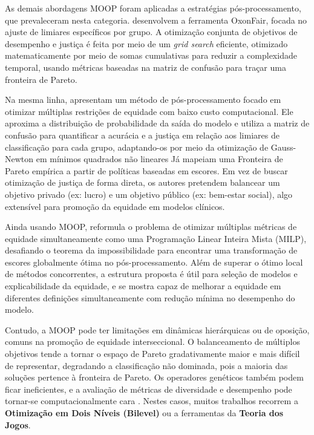 As demais abordagens MOOP foram aplicadas a estratégias pós-processamento, que prevaleceram nesta categoria. \citet{delaney2024oxonfair} desenvolvem a ferramenta OxonFair, focada no ajuste de limiares específicos por grupo. A otimização conjunta de objetivos de desempenho e justiça é feita por meio de um \textit{grid search} eficiente, otimizado matematicamente por meio de somas cumulativas para reduzir a complexidade temporal, usando métricas baseadas na matriz de confusão para traçar uma fronteira de Pareto.

Na mesma linha, \citet{jang2022group} apresentam um método de pós-processamento focado em otimizar múltiplas restrições de equidade com baixo custo computacional. Ele aproxima a distribuição de probabilidade da saída do modelo e utiliza a matriz de confusão para quantificar a acurácia e a justiça em relação aos limiares de classificação para cada grupo, adaptando-os por meio da otimização de Gauss-Newton em mínimos quadrados não lineares
Já \citet{rolf2020balancing} mapeiam uma Fronteira de Pareto empírica a partir de políticas baseadas em escores. Em vez de buscar otimização de justiça de forma direta, os autores pretendem balancear um objetivo privado (ex: lucro) e um objetivo público (ex: bem-estar social), algo extensível para promoção da equidade em modelos clínicos.

Ainda usando MOOP, \citet{hsu2022pushing} reformula o problema de otimizar múltiplas métricas de equidade simultaneamente como uma Programação Linear Inteira Mista (MILP), desafiando o teorema da impossibilidade para encontrar uma transformação de escores globalmente ótima no pós-processamento. Além de superar o ótimo local de métodos concorrentes, a estrutura proposta é útil para seleção de modelos e explicabilidade da equidade, e se mostra capaz de melhorar a equidade em diferentes definições simultaneamente  com redução mínima no desempenho do modelo.

Contudo, a MOOP pode ter limitações em dinâmicas hierárquicas ou de oposição, comuns na promoção de equidade interseccional. O balanceamento de múltiplos  objetivos tende a tornar o espaço de Pareto gradativamente maior e mais difícil de representar, degradando a classificação não dominada, pois a maioria das soluções pertence à fronteira de Pareto. Os operadores genéticos também podem ficar ineficientes, e a avaliação de métricas de diversidade e desempenho pode tornar-se computacionalmente cara \cite{wagner2007pareto}. Nestes casos, muitos trabalhos recorrem a \textbf{Otimização em Dois Níveis (Bilevel)} ou a ferramentas da \textbf{Teoria dos Jogos}.

